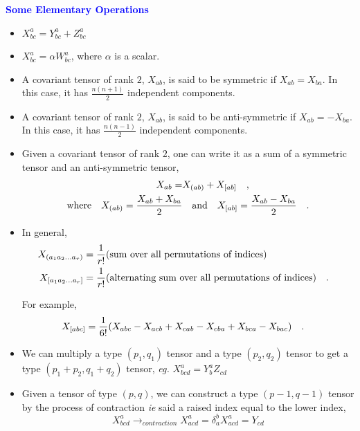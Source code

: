 \documentclass[landscape,aspectratio=169]{slides}
\begin{document}
\begin{slide}
	\textcolor{blue}{\textbf{Some Elementary Operations}}
	
	\begin{itemize}
		\item $X^a_{bc} = Y^a_{bc} + Z^a_{bc}$
		\item $ X^a_{bc} = \alpha W^a_{bc} $, where $ \alpha $ is a scalar.
		\item A covariant tensor of rank $ 2 $,  $ X_{ab} $, is said to be symmetric if $ X_{ab} = X_{ba} $. In this case, it has $ \frac{n(n+1)}{2} $ independent components.
		\item A covariant tensor of rank $ 2 $,  $ X_{ab} $, is said to be anti-symmetric if $ X_{ab} = -X_{ba} $. In this case, it has $ \frac{n(n-1)}{2} $ independent components.
		\item Given a covariant tensor of rank $ 2 $, one can write it as a sum of a symmetric tensor and an anti-symmetric tensor,
		\begin{align*}
		X_{ab} = &X_{(ab)} + X_{[ab]} \qq{,} \\
		\qq{where} X_{(ab)} = \dfrac{X_{ab} + X_{ba}}{2} &\qq{and} X_{[ab]} = \dfrac{X_{ab} - X_{ba}}{2} \qq{.}
		\end{align*}
	\end{itemize}

\end{slide}
\begin{slide}
	\begin{itemize}	
		\item In general,
		\begin{align*}
		X_{(a_1 a_2 \ldots a_r)} &= \dfrac{1}{r!} \text{(sum over all permutations of indices)} \\
		X_{[a_1 a_2 \ldots a_r]} &= \dfrac{1}{r!} \text{(alternating sum over all permutations of indices)} 	\qq{.}	
		\end{align*}
		
		For example, 
		\begin{equation*}\label{key}
		X_{[abc] }  = \dfrac{1}{6!} \qty(X_{abc} -X_{acb} + X_{cab} - X_{cba} + X_{bca} - X_{bac}) \qq{.}
		\end{equation*}
		\item We can multiply a type $ (p_1, q_1) $ tensor and a type $ (p_2, q_2) $ tensor to get a type $ (p_1+p_2, q_1+q_2) $ tensor, \textit{eg.} $ X^a_{bcd}  = Y^a_b Z_{cd}$
	\end{itemize}
\end{slide}
\begin{slide}
	\begin{itemize}
		\item Given a tensor of type $ (p,q) $, we can construct a type $ (p-1, q-1) $ tensor by the process of contraction \textit{ie} said a raised index equal to the lower index,
		$$ X^{a}_{bcd} \rightarrow_{contraction}  X^{a}_{acd}  = \delta_a^b X^{a}_{acd} = Y_{cd}$$
	\end{itemize}
\end{slide}
\end{document}
